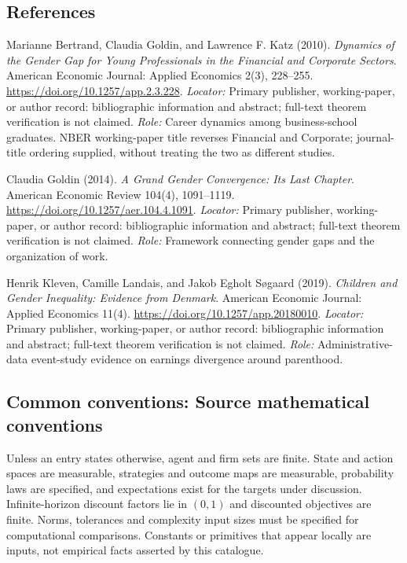 \documentclass[11pt,a4paper]{article}
\begin{document}
\subsection*{References}
\begin{enumerate}[label=\textnormal{[S\arabic*]},leftmargin=*]
\item Marianne Bertrand, Claudia Goldin, and Lawrence F. Katz (2010). \emph{Dynamics of the Gender Gap for Young Professionals in the Financial and Corporate Sectors}. American Economic Journal: Applied Economics 2(3), 228--255. \url{https://doi.org/10.1257/app.2.3.228}. \textit{Locator:} Primary publisher, working-paper, or author record: bibliographic information and abstract; full-text theorem verification is not claimed. \textit{Role:} Career dynamics among business-school graduates. NBER working-paper title reverses Financial and Corporate; journal-title ordering supplied, without treating the two as different studies.
\item Claudia Goldin (2014). \emph{A Grand Gender Convergence: Its Last Chapter}. American Economic Review 104(4), 1091--1119. \url{https://doi.org/10.1257/aer.104.4.1091}. \textit{Locator:} Primary publisher, working-paper, or author record: bibliographic information and abstract; full-text theorem verification is not claimed. \textit{Role:} Framework connecting gender gaps and the organization of work.
\item Henrik Kleven, Camille Landais, and Jakob Egholt Søgaard (2019). \emph{Children and Gender Inequality: Evidence from Denmark}. American Economic Journal: Applied Economics 11(4). \url{https://doi.org/10.1257/app.20180010}. \textit{Locator:} Primary publisher, working-paper, or author record: bibliographic information and abstract; full-text theorem verification is not claimed. \textit{Role:} Administrative-data event-study evidence on earnings divergence around parenthood.
\end{enumerate}

\subsection*{Common conventions: Source mathematical conventions}

Unless an entry states otherwise, agent and firm sets are finite. State and action spaces are measurable, strategies and outcome maps are measurable, probability laws are specified, and expectations exist for the targets under discussion. Infinite-horizon discount factors lie in $(0,1)$ and discounted objectives are finite. Norms, tolerances and complexity input sizes must be specified for computational comparisons. Constants or primitives that appear locally are inputs, not empirical facts asserted by this catalogue.
\end{document}
